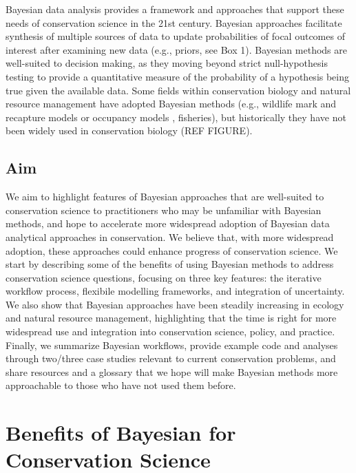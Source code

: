 \documentclass{article}
\begin{document}
\par Bayesian data analysis provides a framework and approaches that support these needs of conservation science in the 21st century. Bayesian approaches facilitate synthesis of multiple sources of data to update probabilities of focal outcomes of interest after examining new data (e.g., priors, see Box 1). Bayesian methods are well-suited to decision making, as they moving beyond strict null-hypothesis testing to
provide a quantitative measure of the probability of a hypothesis being true given the available data. %
Some fields within conservation biology and natural resource management have adopted Bayesian methods (e.g., wildlife mark and recapture models or occupancy models \citep{Kery2011}, fisheries\citep{Doll2018}), but historically they have not been widely used in conservation biology (REF FIGURE).

\subsection*{Aim} We aim to highlight features of Bayesian approaches that are well-suited to conservation science to practitioners who may be unfamiliar with Bayesian methods, and hope to accelerate more widespread adoption of Bayesian data analytical approaches in conservation. We believe that, with more widespread adoption, these approaches could enhance progress of conservation science. We start by describing some of the benefits of using Bayesian methods to address conservation science questions, focusing on three key features: the iterative workflow process, flexibile modelling frameworks, and integration of uncertainty. We also show that Bayesian approaches have been steadily increasing in ecology and natural resource management, highlighting that the time is right for more widespread use and integration into conservation science, policy, and practice. Finally, we summarize Bayesian workflows, provide example code and analyses through two/three case studies relevant to current conservation problems, and share resources and a glossary that we hope will make Bayesian methods more approachable to those who have not used them before.
\section* {Benefits of Bayesian for Conservation Science}
\end{document}
